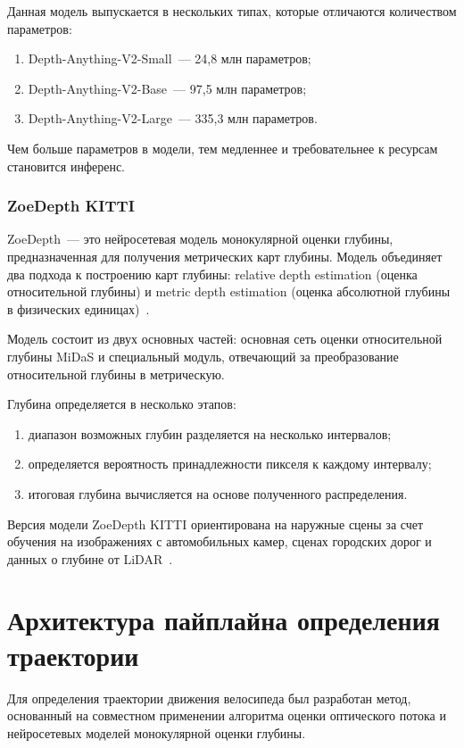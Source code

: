 \documentclass{misisarticle}
\begin{document}
Данная модель выпускается в нескольких типах, которые отличаются количеством параметров:
\begin{enumerate}[leftmargin=0.9cm,topsep=0pt,itemsep=0pt]
  \item Depth-Anything-V2-Small~--- 24{,}8 млн параметров;
  \item Depth-Anything-V2-Base~--- 97{,}5 млн параметров;
  \item Depth-Anything-V2-Large~--- 335{,}3 млн параметров.
\end{enumerate}

Чем больше параметров в модели, тем медленнее и требовательнее к ресурсам становится инференс.

\subsubsection{ZoeDepth KITTI}

ZoeDepth~--- это нейросетевая модель монокулярной оценки глубины, предназначенная для получения метрических карт глубины. Модель объединяет два подхода к построению карт глубины: relative depth estimation (оценка относительной глубины) и metric depth estimation (оценка абсолютной глубины в физических единицах)~\cite{ref6}.

Модель состоит из двух основных частей: основная сеть оценки относительной глубины MiDaS и специальный модуль, отвечающий за преобразование относительной глубины в метрическую.

Глубина определяется в несколько этапов:
\begin{enumerate}[leftmargin=0.9cm,topsep=0pt,itemsep=0pt]
  \item диапазон возможных глубин разделяется на несколько интервалов;
  \item определяется вероятность принадлежности пикселя к каждому интервалу;
  \item итоговая глубина вычисляется на основе полученного распределения.
\end{enumerate}

Версия модели ZoeDepth KITTI ориентирована на наружные сцены за счет обучения на изображениях с автомобильных камер, сценах городских дорог и данных о глубине от LiDAR~\cite{ref6}.

\section{Архитектура пайплайна определения траектории}

Для определения траектории движения велосипеда был разработан метод, основанный на совместном применении алгоритма оценки оптического потока и нейросетевых моделей монокулярной оценки глубины.
\end{document}
